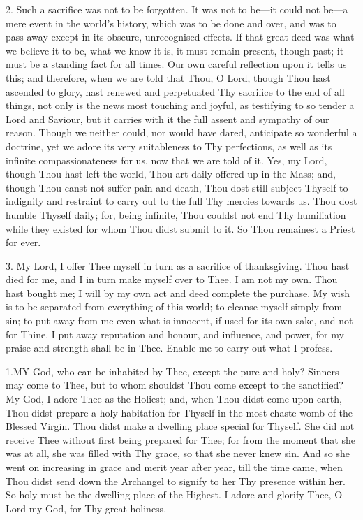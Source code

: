 2. Such a sacrifice was not to
be forgotten. It was not to be—it could not be—a mere event in the
world's history, which was to be done and over, and was to pass away
except in its obscure, unrecognised effects. If that great deed was what
we believe it to be, what we know it is, it must remain present, though
past; it must be a standing fact for all times. Our own careful
reflection upon it tells us this; and therefore, when we are told that
Thou, O Lord, though Thou hast ascended to glory, hast renewed and
perpetuated Thy sacrifice to the end of all things, not only is the news
most touching and joyful, as testifying to so tender a Lord and Saviour,
but it carries with it the full assent and sympathy of our reason.
Though we neither could, nor would have dared, anticipate so wonderful a
doctrine, yet we adore its very suitableness to Thy perfections, as well
as its infinite compassionateness for us, now that we are told of it.
Yes, my Lord, though Thou hast left the world, Thou art daily offered up
in the Mass; and, though Thou canst not suffer pain and death, Thou dost
still subject Thyself to indignity and restraint to carry out to the
full Thy mercies towards us. Thou dost humble Thyself daily; for, being
infinite, Thou couldst not end Thy humiliation while they existed for
whom Thou didst submit to it. So Thou remainest a Priest for ever.

3. My Lord, I offer Thee myself
in turn as a sacrifice of thanksgiving. Thou hast died for me, and I
in turn make myself over to Thee. I am not my own. Thou hast
bought me; I will by my own act and deed complete the purchase. My wish
is to be separated from everything of this world; to cleanse myself
simply from sin; to put away from me even what is innocent, if used for
its own sake, and not for Thine. I put away reputation and honour, and
influence, and power, for my praise and strength shall be in Thee.
Enable me to carry out what I profess.


1.\emph{}MY
God, who can be inhabited by Thee, except the pure and holy? Sinners may
come to Thee, but to whom shouldst Thou come except to the sanctified?
My God, I adore Thee as the Holiest; and, when Thou didst come upon
earth, Thou didst prepare a holy habitation for Thyself in the most
chaste womb of the Blessed Virgin. Thou didst make a dwelling place
special for Thyself. She did not receive Thee without first being
prepared for Thee; for from the moment that she was at all, she was
filled with Thy grace, so that she never knew sin. And so she went on
increasing in grace and merit year after year, till the time came, when
Thou didst send down the Archangel to signify to her Thy presence within
her. So holy must be the dwelling place of the Highest. I adore and
glorify Thee, O Lord my God, for Thy great holiness.

